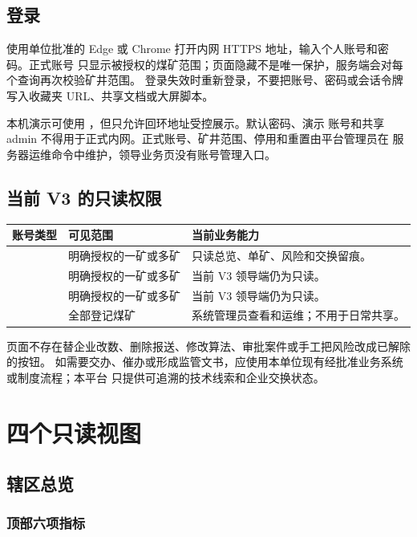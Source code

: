 \documentclass[UTF8,openany,zihao=-4,fontset=none]{ctexbook}
\begin{document}
\section{登录}

使用单位批准的 Edge 或 Chrome 打开内网 HTTPS 地址，输入个人账号和密码。正式账号
只显示被授权的煤矿范围；页面隐藏不是唯一保护，服务端会对每个查询再次校验矿井范围。
登录失效时重新登录，不要把账号、密码或会话令牌写入收藏夹 URL、共享文档或大屏脚本。

本机演示可使用 ，但只允许回环地址受控展示。默认密码、演示
账号和共享 admin 不得用于正式内网。正式账号、矿井范围、停用和重置由平台管理员在
服务器运维命令中维护，领导业务页没有账号管理入口。

\section{当前 V3 的只读权限}

\begin{longtable}{P{32mm}P{55mm}P{57mm}}
\toprule
\textbf{账号类型} & \textbf{可见范围} & \textbf{当前业务能力}\\
\midrule
{} & 明确授权的一矿或多矿 & 只读总览、单矿、风险和交换留痕。\\
 & 明确授权的一矿或多矿 & 当前 V3 领导端仍为只读。\\
 & 明确授权的一矿或多矿 & 当前 V3 领导端仍为只读。\\
 & 全部登记煤矿 & 系统管理员查看和运维；不用于日常共享。\\
\bottomrule
\end{longtable}

页面不存在替企业改数、删除报送、修改算法、审批案件或手工把风险改成已解除的按钮。
如需要交办、催办或形成监管文书，应使用本单位现有经批准业务系统或制度流程；本平台
只提供可追溯的技术线索和企业交换状态。

\chapter{四个只读视图}

\section{辖区总览}

\subsection{顶部六项指标}
\end{document}
